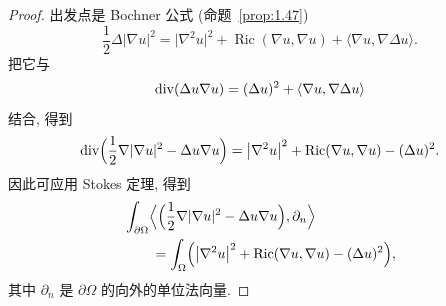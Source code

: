 \begin{proof}
出发点是 Bochner 公式 (命题~\ref{prop:1.47})
\begin{equation}
\frac12\Delta|\nabla u|^2
=\bigl|\nabla^2u\bigr|^2+\operatorname{Ric}(\nabla u,\nabla u)
+\langle\nabla u,\nabla\Delta u\rangle.
\label{eq:7.51}
\end{equation}
把它与
\begin{equation}
\operatorname{div}(\Delta u\nabla u)=(\Delta u)^2+\langle\nabla u,\nabla\Delta u\rangle
\label{eq:7.52}
\end{equation}
结合, 得到
\begin{equation}
\operatorname{div}\Bigl(\frac12\nabla|\nabla u|^2-\Delta u\nabla u\Bigr)
=\bigl|\nabla^2u\bigr|^2+\operatorname{Ric}(\nabla u,\nabla u)-(\Delta u)^2.
\label{eq:7.53}
\end{equation}
因此可应用 Stokes 定理, 得到
\begin{equation}
\begin{aligned}
&\int_{\partial\Omega}
\Bigl\langle\Bigl(\frac12\nabla|\nabla u|^2-\Delta u\nabla u\Bigr),
\partial_n\Bigr\rangle\\
&\qquad=\int_{\Omega}\Bigl(\bigl|\nabla^2u\bigr|^2
+\operatorname{Ric}(\nabla u,\nabla u)-(\Delta u)^2\Bigr),
\end{aligned}
\label{eq:7.54}
\end{equation}
其中 $\partial_n$ 是 $\partial\Omega$ 的向外的单位法向量.


\end{proof}
